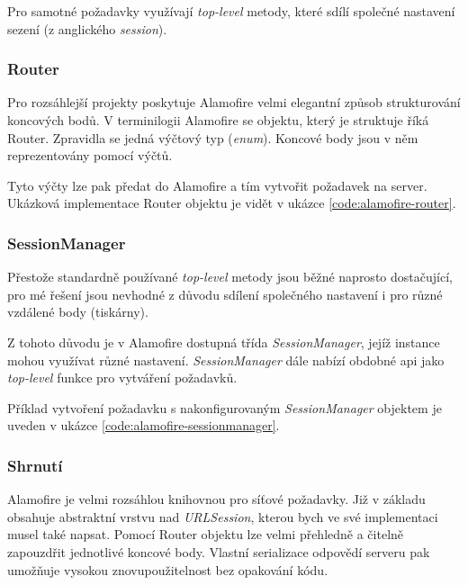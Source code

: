Pro samotné požadavky využívají \textit{top-level} metody, které sdílí společné nastavení sezení (z anglického \textit{session}).

\subsubsection*{Router}

Pro rozsáhlejší projekty poskytuje Alamofire velmi elegantní způsob strukturování koncových bodů.
V terminilogii Alamofire se objektu, který je struktuje říká Router.
Zpravidla se jedná výčtový typ (\textit{enum}).
Koncové body jsou v něm reprezentovány pomocí výčtů.

Tyto výčty lze pak předat do Alamofire a tím vytvořit požadavek na server.
Ukázková implementace Router objektu je vidět v ukázce \ref{code:alamofire-router}.


\subsubsection*{SessionManager}

Přestože standardně používané \textit{top-level} metody jsou běžné naprosto dostačující, pro mé řešení jsou nevhodné z důvodu sdílení společného nastavení i pro různé vzdálené body (tiskárny).

Z tohoto důvodu je v Alamofire dostupná třída \textit{SessionManager}, jejíž instance mohou využívat různé nastavení.
\textit{SessionManager} dále nabízí obdobné \acrshort{api} jako \textit{top-level} funkce pro vytváření požadavků.

Příklad vytvoření požadavku s nakonfigurovaným \textit{SessionManager} objektem je uveden v ukázce \ref{code:alamofire-sessionmanager}.


\subsubsection*{Shrnutí}

Alamofire je velmi rozsáhlou knihovnou pro síťové požadavky.
Již v základu obsahuje abstraktní vrstvu nad \textit{URLSession}, kterou bych ve své implementaci musel také napsat.
Pomocí Router objektu lze velmi přehledně a čitelně zapouzdřit jednotlivé koncové body.
Vlastní serializace odpovědí serveru pak umožňuje vysokou znovupoužitelnost bez opakování kódu.

